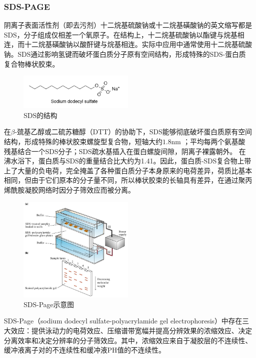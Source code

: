 \subsubsection{SDS-PAGE}
阴离子表面活性剂（即去污剂）十二烷基硫酸钠或十二烷基磺酸钠的英文缩写都是SDS，分子组成仅相差一个氧原子。在结构上，十二烷基硫酸钠以酯键与烷基相连，而十二烷基磺酸钠以酸酐键与烷基相连。实际中应用中通常使用十二烷基硫酸钠。SDS通过影响氢键而破坏蛋白质分子原有空间结构，形成特殊的SDS-蛋白质复合物棒状胶束。

\begin{figure}[H]
    \centering
    \includegraphics[width = 0.5\textwidth]{figure/Some Pictures/SDS.png}
    \caption{SDS的结构}
    \label{fig:enter-label}
\end{figure}

在$\beta$-巯基乙醇或二硫苏糖醇（DTT）的协助下，SDS能够彻底破坏蛋白质原有空间结构，形成特殊的棒状胶束螺旋型复合物，短轴大约$1.8\mathrm{nm}$ ；平均每两个氨基酸残基结合一个SDS分子；SDS疏水基插入在蛋白螺旋间隙，阴离子裸露朝外。
在沸水浴下，蛋白质与SDS的重量结合比大约为1.41。因此，蛋白质-SDS复合物上带上了大量的负电荷，完全掩盖了各种蛋白质分子本身原来的电荷差异，荷质比基本相同，但由于它们原本的分子量不同，所以棒状胶束的长轴具有差异，在通过聚丙烯酰胺凝胶网络时因分子筛效应而被分离。

\begin{figure}[H]
    \centering
    \includegraphics[width = 0.5\textwidth]{figure/Some Pictures/SDS-PAGE简图.png}
    \caption{SDS-Page示意图}
    \label{fig:enter-label}
\end{figure}

SDS-Page（sodium dodecyl sulfate-polyacrylamide gel electrophoresis）中存在三大效应：提供泳动力的电荷效应、压缩谱带宽幅并提高分辨效果的浓缩效应、决定分离效率和决定分辨率的分子筛效应。其中，浓缩效应来自于凝胶层的不连续性、缓冲液离子对的不连续性和缓冲液PH值的不连续性。

